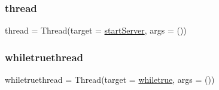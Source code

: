 \subsubsection{\texorpdfstring{thread}{thread}}
{\footnotesize\ttfamily thread = Thread(target = \hyperlink{namespace____main_____a2b75075b3fab588340f99971f29de8da}{start\+Server}, args = ())}

\hypertarget{namespace____main_____a53ebc1b671bc860d557e274c6f7db716}{}\label{namespace____main_____a53ebc1b671bc860d557e274c6f7db716} 
\subsubsection{\texorpdfstring{whiletruethread}{whiletruethread}}
{\footnotesize\ttfamily whiletruethread = Thread(target = \hyperlink{namespace____main_____a5cd663b7efff8164ad13f39d2f577eee}{whiletrue}, args = ())}

